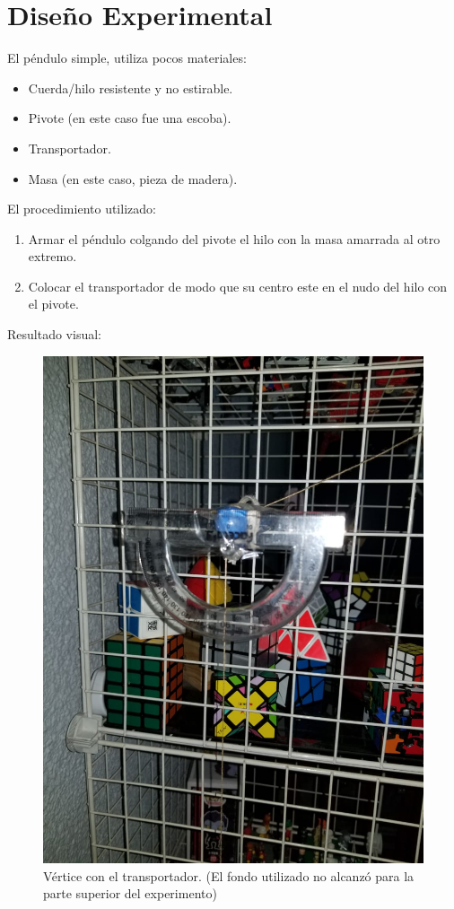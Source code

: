 \documentclass[conference]{IEEEtran}
\begin{document}
\section{Diseño Experimental}
    El péndulo simple, utiliza pocos materiales:
    \begin{itemize}
    	\item Cuerda/hilo resistente y no estirable.
    	\item Pivote (en este caso fue una escoba).
    	\item Transportador.
    	\item Masa (en este caso, pieza de madera).
    \end{itemize}
    El procedimiento utilizado:
    \begin{enumerate}
    	\item Armar el péndulo colgando del pivote el hilo con la masa amarrada al otro extremo.
    	\item Colocar el transportador de modo que su centro este en el nudo del hilo con el pivote.
    \end{enumerate}
    Resultado visual:
    \begin{figure}[H]
    	\centering
    	\includegraphics[scale=0.15]{fotos/1.jpeg}
    	\caption{Vértice con el transportador. (El fondo utilizado no alcanzó para la parte superior del experimento)}
    \end{figure}
\end{document}
